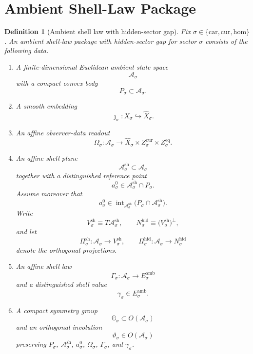 \documentclass[11pt]{article}
\newcommand{\Car}{\mathrm{car}}
\newcommand{\Cur}{\mathrm{cur}}
\newcommand{\Hom}{\mathrm{hom}}
\newcommand{\VisibleAffine}[1]{\widehat X_{#1}}
\newcommand{\AmbientSpace}[1]{\mathcal A_{#1}}
\newcommand{\AmbientBody}[1]{P_{#1}}
\newcommand{\AmbientRead}[1]{\Omega_{#1}}
\newcommand{\AmbientShellLaw}[1]{\Gamma_{#1}}
\newcommand{\AmbientValue}[1]{\gamma_{#1}}
\newcommand{\AmbientSym}[1]{\mathbb G_{#1}}
\newcommand{\AmbientTime}[1]{\vartheta_{#1}}
\newcommand{\ShellAffine}[1]{\mathcal A_{#1}^{\mathrm{sh}}}
\newcommand{\ShellVector}[1]{V_{#1}^{\mathrm{sh}}}
\newcommand{\HiddenSpace}[1]{N_{#1}^{\mathrm{hid}}}
\newcommand{\ShellProj}[1]{\Pi_{#1}^{\mathrm{sh}}}
\newcommand{\HiddenProj}[1]{\Pi_{#1}^{\mathrm{hid}}}
\newcommand{\AmbientRef}[1]{a_{#1}^{0}}
\newcommand{\AmbientTarget}[1]{E_{#1}^{\mathrm{amb}}}
\newtheorem{definition}{Definition}
\begin{document}
\section{Ambient Shell-Law Package}

\begin{definition}[Ambient shell law with hidden-sector gap]
\label{def:ambient}
Fix \(\sigma\in\{\Car,\Cur,\Hom\}\). An \emph{ambient shell-law package with hidden-sector gap} for sector \(\sigma\) consists of the following data.
\begin{enumerate}
    \item A finite-dimensional Euclidean ambient state space
    \[
    \AmbientSpace{\sigma}
    \]
    with a compact convex body
    \[
    \AmbientBody{\sigma}\subset \AmbientSpace{\sigma}.
    \]
    \item A smooth embedding
    \[
    \jmath_{\sigma}:X_{\sigma}\hookrightarrow \VisibleAffine{\sigma}.
    \]
    \item An affine observer-data readout
    \[
    \AmbientRead{\sigma}:\AmbientSpace{\sigma}\to
    \VisibleAffine{\sigma}\times Z_{\sigma}^{\mathrm{cur}}\times Z_{\sigma}^{\mathrm{eq}}.
    \]
    \item An affine shell plane
    \[
    \ShellAffine{\sigma}\subset \AmbientSpace{\sigma}
    \]
    together with a distinguished reference point
    \[
    \AmbientRef{\sigma}\in \ShellAffine{\sigma}\cap \AmbientBody{\sigma}.
    \]
    Assume moreover that
    \[
    \AmbientRef{\sigma}\in
    \operatorname{int}_{\ShellAffine{\sigma}}
    \bigl(\AmbientBody{\sigma}\cap \ShellAffine{\sigma}\bigr).
    \]
    Write
    \[
    \ShellVector{\sigma}\equiv T\ShellAffine{\sigma},
    \qquad
    \HiddenSpace{\sigma}\equiv \bigl(\ShellVector{\sigma}\bigr)^{\perp},
    \]
    and let
    \[
    \ShellProj{\sigma}:\AmbientSpace{\sigma}\to \ShellVector{\sigma},
    \qquad
    \HiddenProj{\sigma}:\AmbientSpace{\sigma}\to \HiddenSpace{\sigma}
    \]
    denote the orthogonal projections.
    \item An affine shell law
    \[
    \AmbientShellLaw{\sigma}:\AmbientSpace{\sigma}\to \AmbientTarget{\sigma}
    \]
    and a distinguished shell value
    \[
    \AmbientValue{\sigma}\in \AmbientTarget{\sigma}.
    \]
    \item A compact symmetry group
    \[
    \AmbientSym{\sigma}\subset O(\AmbientSpace{\sigma})
    \]
    and an orthogonal involution
    \[
    \AmbientTime{\sigma}\in O(\AmbientSpace{\sigma})
    \]
    preserving \(\AmbientBody{\sigma}\), \(\ShellAffine{\sigma}\), \(\AmbientRef{\sigma}\), \(\AmbientRead{\sigma}\), \(\AmbientShellLaw{\sigma}\), and \(\AmbientValue{\sigma}\).

\end{enumerate}
\end{definition}
\end{document}
